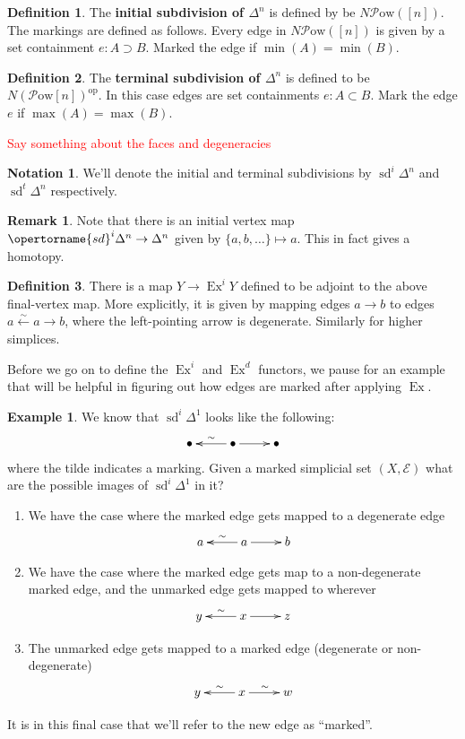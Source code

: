 \documentclass[english]{amsart}
\newcommand{\mc}{\mathcal}
\newcommand{\ques}[1]{\textcolor{red}{#1}}
\theoremstyle{definition}
\newtheorem*{defn}{Definition}
\newtheorem*{example}{Example}
\newtheorem*{rmk}{Remark}
\newtheorem*{notation}{Notation}
\begin{document}
\begin{defn}
The \textbf{initial subdivision of $\Delta^n$} is defined by be $N \mc{P}\text{ow}([n])$. The markings are defined as follows. Every edge in $N \mc{P}\text{ow}([n])$ is given by a set containment $e : A \supset B$. Marked the edge if $\operatorname{min}(A) = \operatorname{min}(B)$. 
\end{defn}

\begin{defn}
The \textbf{terminal subdivision of $\Delta^n$} is defined to be $N (\mc{P}\text{ow}[n])^{\text{op}}$. In this case edges are set containments $e: A \subset B$. Mark the edge $e$ if $\max (A) =\max(B)$. 
\end{defn}

\ques{Say something about the faces and degeneracies}

\begin{notation}
We'll denote the initial and terminal subdivisions by $\operatorname{sd}^i \Delta^n$ and $\operatorname{sd}^t \Delta^n$ respectively. 
\end{notation}

\begin{rmk}
Note that there is an initial vertex map $\opertorname{sd}^i \Delta^n \to \Delta^n$ given by $\{a, b, \dots\} \mapsto a$. This in fact gives a homotopy. 
\end{rmk}

\begin{defn}
There is a map $Y \to \operatorname{Ex}^i Y$ defined to be adjoint to the above final-vertex map. More explicitly, it is given by mapping edges $a\to b$ to edges $a \xleftarrow{\sim} a \to b$, where the left-pointing arrow is degenerate. Similarly for higher simplices. 
\end{defn}

Before we go on to define the $\operatorname{Ex}^i$ and $\operatorname{Ex}^d$ functors, we pause for an example that will be helpful in figuring out how edges are marked after applying $\operatorname{Ex}$.

\begin{example}
We know that $\operatorname{sd}^i \Delta^1$ looks like the following:
\[
\xymatrix{
\bullet  & \bullet \ar[l]_\sim \ar[r] & \bullet
}
\]
where the tilde indicates a marking. Given a marked simplicial set $(X,\mc{E})$ what are the possible images of $\operatorname{sd}^i \Delta^1$ in it?

\begin{enumerate}
\item We have the case where the marked edge gets mapped to a degenerate edge
\[
\xymatrix{
a  & a \ar[l]_\sim \ar[r] & b
}
\]
\item We have the case where the marked edge gets map to a non-degenerate marked edge, and the unmarked edge gets mapped to wherever
\[
\xymatrix{
y  & x \ar[l]_\sim \ar[r] & z
}
\]
\item The unmarked edge gets mapped to a marked edge (degenerate or non-degenerate)
\[
\xymatrix{
y  & x \ar[l]_\sim \ar[r]^\sim & w
}
\]
\end{enumerate}
It is in this final case that we'll refer to the new edge as ``marked''. 
\end{example} 
\end{document}
